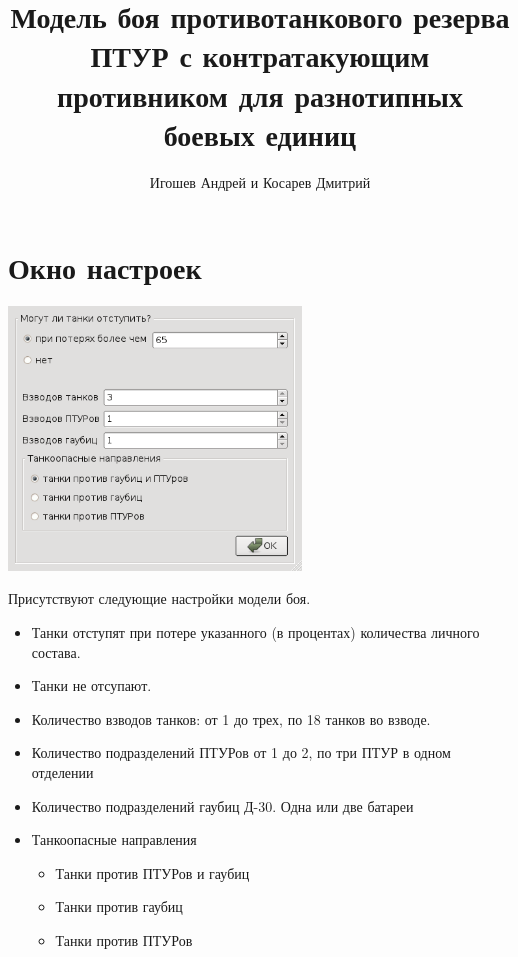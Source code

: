 \documentclass{cw1}
\begin{document}
\sloppy

\title{Модель боя противотанкового резерва ПТУР с контратакующим противником
для разнотипных боевых единиц}

\author{Игошев Андрей и Косарев Дмитрий}

\maketitle
\setcounter{page}{2}

\section{Окно настроек}
\begin{center}
\includegraphics[height=70mm]{img1.png}
\end{center}
Присутствуют следующие настройки модели боя.
\begin{itemize}
 \item Танки отступят при потере указанного (в процентах) количества личного состава.
 \item Танки не отсупают.
 \item Количество взводов танков: от 1 до трех, по 18 танков во взводе.
 \item Количество подразделений ПТУРов от 1 до 2, по три ПТУР в одном отделении
 \item Количество подразделений гаубиц Д-30. Одна или две батареи
 \item Танкоопасные направления
   \begin{itemize}
    \item Танки против ПТУРов и гаубиц
    \item Танки против гаубиц
    \item Танки против ПТУРов
   \end{itemize}
\end{itemize}
\end{document}
